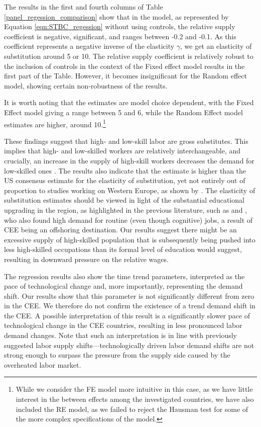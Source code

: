 \documentclass[11pt]{article}
\begin{document}
The results in the first and fourth columns of Table \ref{panel_regession_comparison} show that in the model, as represented by Equation \ref{eqn:STBC_regession} without using controls, the relative supply coefficient is negative, significant, and ranges between -0.2 and -0.1. As this coefficient represents a negative inverse of the elasticity $\gamma$, we get an elasticity of substitution around 5 or 10. The relative supply coefficient is relatively robust to the inclusion of controls in the context of the Fixed effect model results in the first part of the Table. However, it becomes insignificant for the Random effect model, showing certain non-robustness of the results.

It is worth noting that the estimates are model choice dependent, with the Fixed Effect model giving a range between 5 and 6, while the Random Effect model estimates are higher, around 10.\footnote{While we consider the FE model more intuitive in this case, as we have little interest in the between effects among the investigated countries, we have also included the RE model, as we failed to reject the Hausman test for some of the more complex specifications of the model.}

These findings suggest that high- and low-skill labor are gross substitutes. This implies that high- and low-skilled workers are relatively interchangeable, and crucially, an increase in the supply of high-skill workers decreases the demand for low-skilled ones \citep{havranek2020elasticity}. The results also indicate that the estimate is higher than the US consensus estimate for the elasticity of substitution, yet not entirely out of proportion to studies working on Western Europe, as shown by \cite{havranek2020elasticity}. The elasticity of substitution estimates should be viewed in light of the substantial educational upgrading in the region, as highlighted in the previous literature, such as \citet{arendt2019technical} and \citet{hardy2018educational}, who also found high demand for routine (even though cognitive) jobs, a result of CEE being an offshoring destination. Our results suggest there might be an excessive supply of high-skilled population that is subsequently being pushed into less high-skilled occupations than its formal level of education would suggest, resulting in downward pressure on the relative wages.

The regression results also show the time trend parameters, interpreted as the pace of technological change and, more importantly, representing the demand shift. Our results show that this parameter is not significantly different from zero in the CEE. We therefore do not confirm the existence of a trend demand shift in the CEE. A possible interpretation of this result is a significantly slower pace of technological change in the CEE countries, resulting in less pronounced labor demand changes. Note that such an interpretation is in line with previously suggested labor supply shifts—technologically driven labor demand shifts are not strong enough to surpass the pressure from the supply side caused by the overheated labor market.
\end{document}
